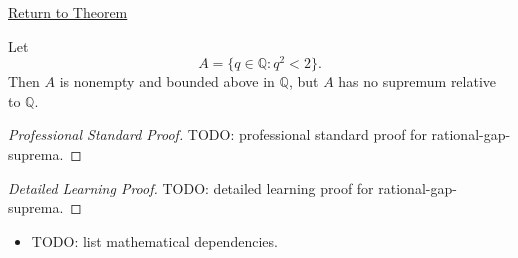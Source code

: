 \newpage
{}
\label{prf:rational-gap-suprema}

\begin{remark*}[Return]
\hyperref[lem:rational-gap-suprema]{Return to Theorem}
\end{remark*}

\begin{theorem*}
Let
\[
  A=\{q\in\mathbb{Q}:q^2<2\}.
\]
Then $A$ is nonempty and bounded above in $\mathbb{Q}$, but $A$ has no supremum relative to $\mathbb{Q}$.
\end{theorem*}

\begin{proof}[Professional Standard Proof]
\LRAProofBodyStart
TODO: professional standard proof for rational-gap-suprema.
\end{proof}

\begin{proof}[Detailed Learning Proof]
\LRAProofBodyStart
TODO: detailed learning proof for rational-gap-suprema.
\end{proof}

\begin{remark*}
\end{remark*}

\begin{dependencies}
\begin{itemize}
  \item TODO: list mathematical dependencies.
\end{itemize}
\end{dependencies}

\clearpage
